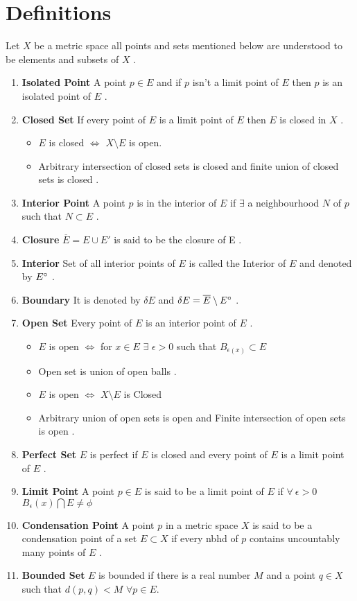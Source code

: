 \section{Definitions}
Let $X$ be a metric space all points and sets mentioned below are understood to be elements and subsets of $X$ . 
\begin{enumerate}
	\item \textbf{Isolated Point} A point $p\in E$ and if  $p$ isn't a limit point of $E$ then $p$ is an isolated point of $E$ .
	\item  \textbf{Closed Set} If every point of $E$ is a limit point of $E$ then $E$ is closed in $X$ .
	\begin{itemize}
		\item $E$ is closed $\iff$ $X\setminus E$ is open. 
		\item Arbitrary intersection of closed sets is closed and finite union of closed sets is closed .
	\end{itemize}
	\item  \textbf{Interior Point } A point $p$ is in the interior of $E$ if $\exists$ a neighbourhood $N$ of $p$ such that $N\subset E$ .
	\item  \textbf{Closure } $\overline E =E\cup E'$ is said to be the closure of E  .
	\item \textbf{Interior} Set of all interior points of $E$ is called the Interior of $E$ and denoted by $E\degree$ .
	\item  \textbf{Boundary} It is denoted by $\delta E$ and $\delta E = \overline{E}\setminus E\degree $ .
	\item  \textbf{Open Set} Every point of $E$ is an interior point of $E$ .\begin{itemize}
		\item  $E$ is open $\iff$ for $x\in E $ $\exists $ $\epsilon>0$ such that $B_{\epsilon(x)}\subset E$
		\item  Open set is union of open balls .
		\item $E$ is open $\iff$ $X\setminus E$ is Closed 
		\item Arbitrary union of open sets is open and Finite intersection of open sets is open .
	\end{itemize}
	\item  \textbf{Perfect Set } $E$ is perfect if $E$ is closed and every point of $E$ is a limit point of $E$ .
	\item \textbf{Limit Point }	A point $p\in E$ is said to be a limit point of $E$ if $\forall  \ \epsilon >0 $ $B_{\epsilon}(x)\bigcap E  \neq \phi$
	\item \textbf{Condensation Point } A point $p$ in a metric space $X$ is said to be a condensation point of a set $E\subset X$ if every nbhd of $p$ contains uncountably many points of $E$ .
	\item  \textbf{Bounded Set} $E$ is bounded if there is a real number  $M$ and a point $q \in X$ such that $d(p,q) < M $ $\forall p \in E.$
	

\end{enumerate}
